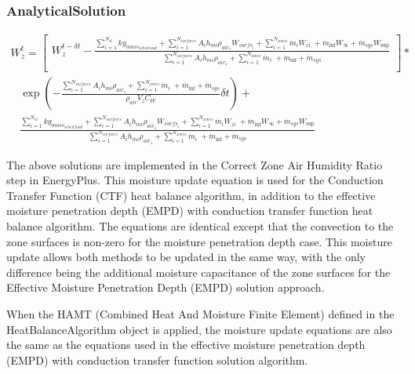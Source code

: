 \subsubsection{AnalyticalSolution}\label{analyticalsolution-1-001}

\begin{equation}
\begin{array}{l}W_z^t = \left[ \begin{array}{l}W_z^{t - \delta t} - \frac{{\sum\limits_{i = 1}^{{N_{sl}}} {k{g_{mas{s_{sched\;load}}}}}  + \sum\limits_{i = 1}^{{N_{surfaces}}} {{A_i}{h_{mi}}} {\rho_{ai{r_z}}}{W_{surf{s_i}}} + \sum\limits_{i = 1}^{{N_{zones}}} {{{\dot m}_i}} {W_{zi}}\; + {{\dot m}_{\inf }}{W_\infty } + {{\dot m}_{sys}}{W_{\sup }}}}{{\sum\limits_{i = 1}^{{N_{surfaces}}} {{A_i}{h_{mi}}} {\rho_{ai{r_z}}} + \sum\limits_{i = 1}^{{N_{zones}}} {{{\dot m}_i}} \; + {{\dot m}_{\inf }} + {{\dot m}_{sys}}}}\\\end{array} \right]*\\\;\;\;\exp \left( { - \frac{{\sum\limits_{i = 1}^{{N_{surfaces}}} {{A_i}{h_{mi}}} {\rho_{ai{r_z}}} + \sum\limits_{i = 1}^{{N_{zones}}} {{{\dot m}_i}} \; + {{\dot m}_{\inf }} + {{\dot m}_{sys}}}}{{{\rho_{air}}{V_z}{C_W}}}\delta t} \right) + \\\;\;\;\frac{{\sum\limits_{i = 1}^{{N_{sl}}} {k{g_{mas{s_{sched\;load}}}}}  + \sum\limits_{i = 1}^{{N_{surfaces}}} {{A_i}{h_{mi}}} {\rho_{ai{r_z}}}{W_{surf{s_i}}} + \sum\limits_{i = 1}^{{N_{zones}}} {{{\dot m}_i}} {W_{zi}}\; + {{\dot m}_{\inf }}{W_\infty } + {{\dot m}_{sys}}{W_{\sup }}}}{{\sum\limits_{i = 1}^{{N_{surfaces}}} {{A_i}{h_{mi}}} {\rho_{ai{r_z}}} + \sum\limits_{i = 1}^{{N_{zones}}} {{{\dot m}_i}} \; + {{\dot m}_{\inf }} + {{\dot m}_{sys}}}}\end{array}
\end{equation}

The above solutions are implemented in the Correct Zone Air Humidity Ratio step in EnergyPlus. This moisture update equation is used for the Conduction Transfer Function (CTF) heat balance algorithm, in addition to the effective moisture penetration depth (EMPD) with conduction transfer function heat balance algorithm. The equations are identical except that the convection to the zone surfaces is non-zero for the moisture penetration depth case. This moisture update allows both methods to be updated in the same way, with the only difference being the additional moisture capacitance of the zone surfaces for the Effective Moisture Penetration Depth (EMPD) solution approach.

When the HAMT (Combined Heat And Moisture Finite Element) defined in the HeatBalanceAlgorithm object is applied, the moisture update equations are also the same as the equations used in the effective moisture penetration depth (EMPD) with conduction transfer function solution algorithm.
